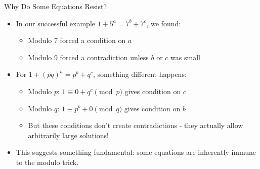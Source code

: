 ﻿\documentclass[10pt,aspectratio=169]{beamer}
\begin{document}
\begin{frame}{Why Do Some Equations Resist?}
    \begin{itemize}
        \item In our successful example $1+5^a = 7^b+7^c$, we found:
        \begin{itemize}
            \item Modulo 7 forced a condition on $a$
            \item Modulo 9 forced a contradiction unless $b$ or $c$ was small
        \end{itemize}
        
        \item For $1+(pq)^a = p^b+q^c$, something different happens:
        \begin{itemize}
            \item Modulo $p$: $1 \equiv 0 + q^c \pmod p$ gives condition on $c$
            \item Modulo $q$: $1 \equiv p^b + 0 \pmod q$ gives condition on $b$
            \item But these conditions don't create contradictions - they actually allow arbitrarily large solutions!
        \end{itemize}
        
        \item This suggests something fundamental: some equations are inherently immune to the modulo trick.
    \end{itemize}
\end{frame}
\end{document}
